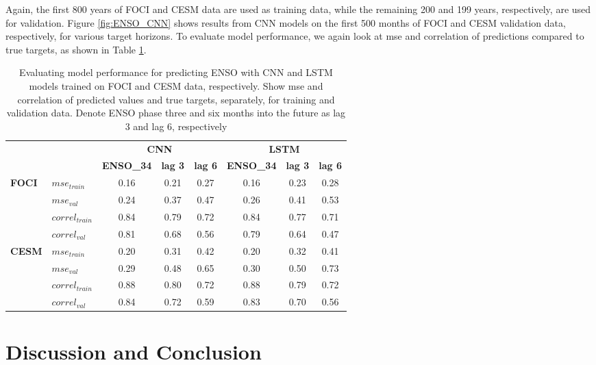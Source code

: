 \documentclass{CUP-JNL-DTM}%
\theoremstyle{definition}
\numberwithin{equation}{section}
\begin{document}
Again, the first 800 years of FOCI and CESM data are used as training data, while the remaining 200 and 199 years, respectively, are used for validation. Figure \ref{fig:ENSO_CNN} shows results from CNN models on the first 500 months of FOCI and CESM validation data, respectively, for various target horizons. To evaluate model performance, we again look at mse and correlation of predictions compared to true targets, as shown in Table \ref{tab:ENSO_Eval}.

\begin{table}
\caption{Evaluating model performance for predicting ENSO with CNN and LSTM models trained on FOCI and CESM data, respectively. Show mse and correlation of predicted values and true targets, separately, for training and validation data. Denote ENSO phase three and six months into the future as lag 3 and lag 6, respectively} \label{tab:ENSO_Eval}

\begin{center}
\begin{tabular}{|ll|c|c|c|c|c|c|}
\hline
 & & \multicolumn{3}{c|}{\textbf{CNN}} & \multicolumn{3}{c|}{\textbf{LSTM}} \\
 & & \textbf{ENSO\_34} & \textbf{lag 3} & \textbf{lag 6} & \textbf{ENSO\_34} & \textbf{lag 3} & \textbf{lag 6} \\
\hline
\multirow{4}{*}{\textbf{FOCI}} & $mse_{train}$ & 0.16 & 0.21 & 0.27 & 0.16 & 0.23 & 0.28 \\
 & $mse_{val}$ & 0.24 & 0.37 & 0.47 & 0.26 & 0.41 & 0.53 \\
 & $correl_{train}$ & 0.84 & 0.79 & 0.72 & 0.84 & 0.77 & 0.71 \\
 & $correl_{val}$ & 0.81 & 0.68 & 0.56 & 0.79 & 0.64 & 0.47 \\
\hline
\multirow{4}{*}{\textbf{CESM}} & $mse_{train}$ & 0.20 & 0.31 & 0.42 & 0.20 & 0.32 & 0.41 \\
 & $mse_{val}$ & 0.29 & 0.48 & 0.65 & 0.30 & 0.50 & 0.73 \\
 & $correl_{train}$ & 0.88 & 0.80 & 0.72 & 0.88 & 0.79 & 0.72 \\
 & $correl_{val}$ & 0.84 & 0.72 & 0.59 & 0.83 & 0.70 & 0.56 \\
\hline
\end{tabular}
\end{center}
\end{table}

\section{Discussion and Conclusion \label{sec:Discussion_Conclusion}}
\end{document}
